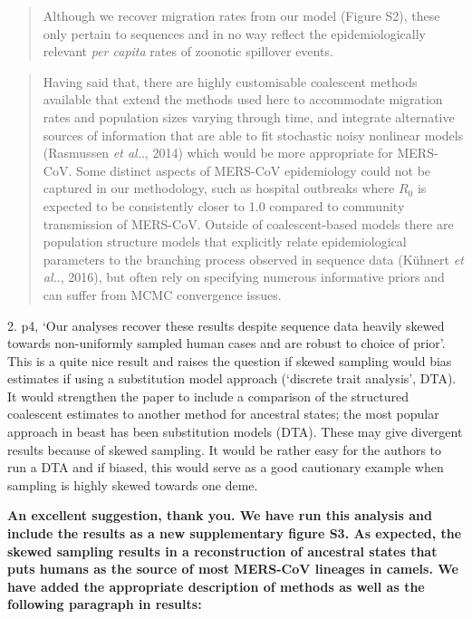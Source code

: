 \documentclass[11pt,oneside,letterpaper]{article}
\begin{document}
\begin{quotation}
Although we recover migration rates from our model (Figure S2), these only pertain to sequences and in no way reflect the epidemiologically relevant \textit{per capita} rates of zoonotic spillover events.
\end{quotation}

\begin{quotation}
Having said that, there are highly customisable coalescent methods available that extend the methods used here to accommodate migration rates and population sizes varying through time, and integrate alternative sources of information that are able to fit stochastic noisy nonlinear models (Rasmussen \textit{et al.}., 2014) which would be more appropriate for MERS-CoV.
Some distinct aspects of MERS-CoV epidemiology could not be captured in our methodology, such as hospital outbreaks where $R_{0}$ is expected to be consistently closer to 1.0 compared to community transmission of MERS-CoV.
Outside of coalescent-based models there are population structure models that explicitly relate epidemiological parameters to the branching process observed in sequence data (K\"{u}hnert \textit{et al.}., 2016), but often rely on specifying numerous informative priors and can suffer from MCMC convergence issues.
\end{quotation}

%
2. p4, `Our analyses recover these results despite sequence data heavily skewed towards non-uniformly sampled human cases and are robust to choice of prior'. This is a quite nice result and raises the question if skewed sampling would bias estimates if using a substitution model approach (`discrete trait analysis', DTA). It would strengthen the paper to include a comparison of the structured coalescent estimates to another method for ancestral states; the most popular approach in beast has been substitution models (DTA). These may give divergent results because of skewed sampling. It would be rather easy for the authors to run a DTA and if biased, this would serve as a good cautionary example when sampling is highly skewed towards one deme.

\textbf{An excellent suggestion, thank you. We have run this analysis and include the results as a new supplementary figure S3. As expected, the skewed sampling results in a reconstruction of ancestral states that puts humans as the source of most MERS-CoV lineages in camels. We have added the appropriate description of methods as well as the following paragraph in results:}
\end{document}
